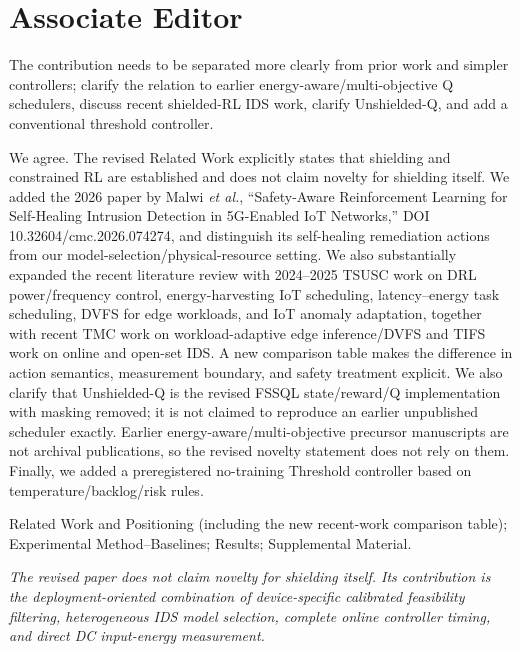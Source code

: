 \documentclass[11pt,a4paper]{article}
\newcommand{\commentbox}[1]{\begin{rcommentbox}#1\end{rcommentbox}}
\newcommand{\responsebox}[1]{\begin{authorresponsebox}#1\end{authorresponsebox}}
\newcommand{\changebox}[1]{\begin{wherebox}#1\end{wherebox}}
\begin{document}
\section*{Associate Editor}

\commentbox{The contribution needs to be separated more clearly from prior work and simpler controllers; clarify the relation to earlier energy-aware/multi-objective Q schedulers, discuss recent shielded-RL IDS work, clarify Unshielded-Q, and add a conventional threshold controller.}
\responsebox{We agree. The revised Related Work explicitly states that shielding and constrained RL are established and does not claim novelty for shielding itself. We added the 2026 paper by Malwi \emph{et al.}, ``Safety-Aware Reinforcement Learning for Self-Healing Intrusion Detection in 5G-Enabled IoT Networks,'' DOI 10.32604/cmc.2026.074274, and distinguish its self-healing remediation actions from our model-selection/physical-resource setting. We also substantially expanded the recent literature review with 2024--2025 TSUSC work on DRL power/frequency control, energy-harvesting IoT scheduling, latency--energy task scheduling, DVFS for edge workloads, and IoT anomaly adaptation, together with recent TMC work on workload-adaptive edge inference/DVFS and TIFS work on online and open-set IDS. A new comparison table makes the difference in action semantics, measurement boundary, and safety treatment explicit. We also clarify that Unshielded-Q is the revised FSSQL state/reward/Q implementation with masking removed; it is not claimed to reproduce an earlier unpublished scheduler exactly. Earlier energy-aware/multi-objective precursor manuscripts are not archival publications, so the revised novelty statement does not rely on them. Finally, we added a preregistered no-training Threshold controller based on temperature/backlog/risk rules.}
\changebox{Related Work and Positioning (including the new recent-work comparison table); Experimental Method--Baselines; Results; Supplemental Material.}
\begin{excerptbox}
\emph{The revised paper does not claim novelty for shielding itself. Its contribution is the deployment-oriented combination of device-specific calibrated feasibility filtering, heterogeneous IDS model selection, complete online controller timing, and direct DC input-energy measurement.}
\end{excerptbox}
\end{document}
